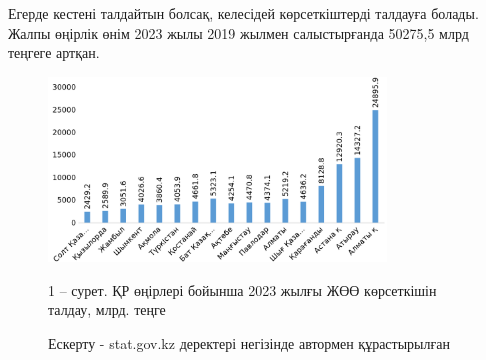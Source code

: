 Егерде кестені талдайтын болсақ, келесідей көрсеткіштерді талдауға
болады. Жалпы өңірлік өнім 2023 жылы 2019 жылмен салыстырғанда 50275,5
млрд теңгеге артқан.

\begin{figure}[H]
	\centering
	\includegraphics[width=0.8\textwidth]{media/ekon/image1000}
	\caption*{1 -- сурет. ҚР өңірлері бойынша 2023 жылғы ЖӨӨ көрсеткішін
талдау, млрд. теңге}
	\caption*{Ескерту - stat.gov.kz деректері негізінде автормен құрастырылған}
\end{figure}

